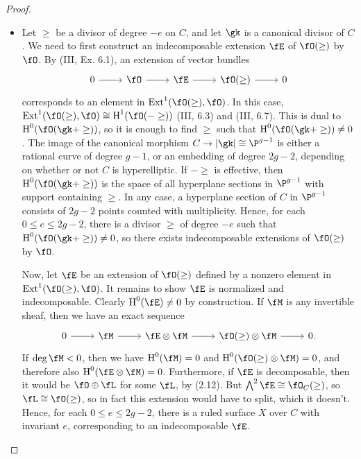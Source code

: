 \documentclass[a4paper]{article}
\begin{document}
\begin{enumerate} [label=\textbf{\arabic*.}, leftmargin=0em]
          \begin{proof} $ $ \vspace{0pt}
              \begin{itemize} [leftmargin=0cm]
                  \item[(a)] Let $\ge$ be a divisor of degree $-e$ on $C$, and let $\gk$ is a canonical divisor of $C$.
                        We need to first construct an indecomposable extension $\fE$ of $\fO(\ge)$ by $\fO$.
                        By (III, Ex. 6.1), an extension of vector bundles
                        \[ \begin{tikzcd}
                                0 \arrow[r] & \fO \arrow[r] & \fE \arrow[r] & \fO(\ge) \arrow[r] & 0
                            \end{tikzcd} \]
                        corresponds to an element in $\Ext^1(\fO(\ge), \fO)$.
                        In this case, $\Ext^1(\fO(\ge), \fO) \cong \cH^1(\fO(-\ge))$ (III, 6.3) and (III, 6.7).
                        This is dual to $\cH^0(\fO(\gk + \ge))$, so it is enough to find $\ge$ such that $\cH^0(\fO(\gk + \ge)) \neq 0$.
                        The image of the canonical morphism $C \to |\gk| \cong \P^{g - 1}$ is either a rational curve of degree $g - 1$, or an embedding of degree $2g - 2$, depending on whether or not $C$ is hyperelliptic.
                        If $-\ge$ is effective, then $\cH^0(\fO(\gk + \ge))$ is the space of all hyperplane sections in $\P^{g - 1}$ with support containing $\ge$.
                        In any case, a hyperplane section of $C$ in $\P^{g - 1}$ consists of $2g - 2$ points counted with multiplicity.
                        Hence, for each $0 \leq e \leq 2g - 2$, there is a divisor $\ge$ of degree $-e$ such that $\cH^0(\fO(\gk + \ge)) \neq 0$, so there exists indecomposable extensions of $\fO(\ge)$ by $\fO$.

                        Now, let $\fE$ be an extension of $\fO(\ge)$ defined by a nonzero element in $\Ext^1(\fO(\ge), \fO)$.
                        It remains to show $\fE$ is normalized and indecomposable.
                        Clearly $\cH^0(\fE) \neq0$ by construction.
                        If $\fM$ is any invertible sheaf, then we have an exact sequence
                        \[ \begin{tikzcd}
                                0 \arrow[r] & \fM \arrow[r] & \fE \otimes \fM \arrow[r] & \fO(\ge) \otimes \fM \arrow[r] & 0.
                            \end{tikzcd} \]
                        If $\deg \fM < 0$, then we have $\cH^0(\fM) = 0$ and $\cH^0(\fO(\ge) \otimes \fM) = 0$, and therefore also $\cH^0(\fE \otimes \fM) = 0$.
                        Furthermore, if $\fE$ is decomposable, then it would be $\fO \oplus \fL$ for some $\fL$, by (2.12).
                        But $\bigwedge^2 \fE \cong \fO_C(\ge)$, so $\fL \cong \fO(\ge)$, so in fact this extension would have to split, which it doesn't.
                        Hence, for each $0 \leq e \leq 2g - 2$, there is a ruled surface $X$ over $C$ with invariant $e$, corresponding to an indecomposable $\fE$.


\end{itemize}
\end{proof}
\end{enumerate}
\end{document}
